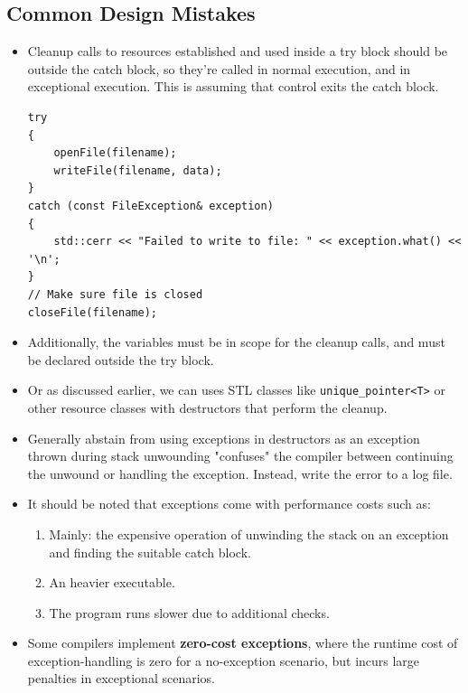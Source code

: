 \documentclass{report}
\begin{document}
\subsection{Common Design Mistakes}
\begin{itemize}
\item Cleanup calls to resources established and used inside a try block should be outside the catch block, so they're called in normal execution, and in exceptional execution. This is assuming that control exits the catch block.
\begin{lstlisting}
try
{
    openFile(filename);
    writeFile(filename, data);
}
catch (const FileException& exception)
{
    std::cerr << "Failed to write to file: " << exception.what() << '\n';
}
// Make sure file is closed
closeFile(filename);
\end{lstlisting}
\item Additionally, the variables must be in scope for the cleanup calls, and must be declared outside the try block.
\item Or as discussed earlier, we can uses STL classes like \texttt{unique\_pointer<T>} or other resource
classes with destructors that perform the cleanup.
\item Generally abstain from using exceptions in destructors as an exception thrown during stack unwounding
"confuses" the compiler between continuing the unwound or handling the exception.
Instead, write the error to a log file.
\item It should be noted that exceptions come with performance costs such as:
\begin{enumerate}
    \item Mainly: the expensive operation of unwinding the stack on an exception and finding the suitable catch block.
    \item An heavier executable.
    \item The program runs slower due to additional checks.
\end{enumerate}
\item Some compilers implement \textbf{zero-cost exceptions}, where the runtime cost
 of exception-handling is zero for a no-exception scenario, but incurs large penalties
 in exceptional scenarios.
\end{itemize}
\end{document}
